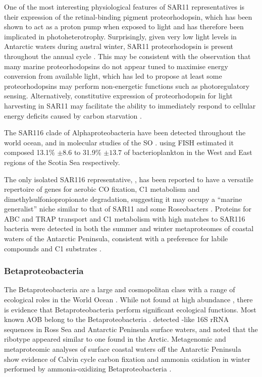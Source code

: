 One of the most interesting physiological features of SAR11 representatives is their expression of the retinal-binding pigment proteorhodopsin, which has been shown to act as a proton pump when exposed to light \cite{Anonymous:2012ck} and has therefore been implicated in photoheterotrophy.
Surprisingly, given very low light levels in Antarctic waters during austral winter, SAR11 proteorhodopsin is present throughout the annual cycle \cite{Williams:2012bs}.
This may be consistent with the observation that many marine proteorhodopsins do not appear tuned to maximise energy conversion from available light, which has led \citet{Fuhrman:2008he} to propose at least some proteorhodopsins may perform non-energetic functions such as photoregulatory sensing.
Alternatively, constitutive expression of proteorhodopsin for light harvesting in SAR11 may facilitate the ability to immediately respond to cellular energy deficits caused by carbon starvation \cite{Steindler:2011hk}.


The SAR116 clade of Alphaproteobacteria have been detected throughout the world ocean, and in molecular studies of the \ac{SO} \cite{West:2008kc,Topping:2006ul}.
 \citet{Topping:2006ul} using \ac{FISH} estimated it composed 13.1\% $\pm 8.6$ to 31.9\% $\pm13.7$ of bacterioplankton in the West and East regions of the Scotia Sea respectively.

The only isolated SAR116 representative, , has been reported to have a versatile repertoire of genes for aerobic CO fixation, C1 metabolism and dimethylsulfoniopropionate degradation, suggesting it may occupy a ``marine generalist'' niche similar to that of SAR11 and some Roseobacters \cite{Oh:2010di}.
Proteins for ABC and TRAP transport and C1 metabolism with high matches to SAR116 bacteria were detected in both the summer and winter metaproteomes of coastal waters of the Antarctic Peninsula, consistent with a preference for labile compounds and C1 substrates \cite{Williams:2012bs}.

\subsubsection{Betaproteobacteria}

The Betaproteobacteria are a large and cosmopolitan class with a range of ecological roles in the World Ocean \citep[reviewed in][]{Kirchman:2008wz}.
While not found at high abundance \cite{Gentile:2006ef,Ghiglione:2011ee,Jamieson:2012up}, there is evidence that Betaproteobacteria perform significant ecological functions.
Most known \ac{AOB} belong to the Betaproteobacteria \cite{Head:1993vt,Teske:1994wt}.
\citet{Hollibaugh:2002em} detected -like 16S rRNA sequences in Ross Sea and Antarctic Peninsula surface waters, and noted that the ribotype appeared similar to one found in the Arctic.
Metagenomic and metaproteomic analyses of surface coastal waters off the Antarctic Peninsula show evidence of Calvin cycle carbon fixation and ammonia oxidation in winter performed by ammonia-oxidizing Betaproteobacteria \cite{Grzymski:2012ej,Williams:2012bs}.


